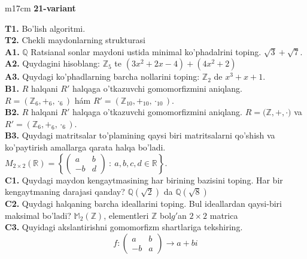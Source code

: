 \documentclass{article}
\begin{document}
\begin{tabular}{m{17cm}}
\textbf{21-variant}
\newline

\textbf{T1.} Bo'lish algoritmi. \\
\textbf{T2.} Chekli maydonlarning strukturasi \\
\textbf{A1.} \(\mathbb{Q}\) Ratsianal sonlar maydoni ustida minimal ko'phadalrini toping.
\(\sqrt{3} + \sqrt{7}\). \\
\textbf{A2.} Quydagini hisoblang:
\(\mathbb{Z}_{5}\) te \(\left( 3x^{2} + 2x - 4 \right) + \left( 4x^{2} + 2 \right)\) \\
\textbf{A3.} Quydagi ko'phadlarning barcha nollarini toping:
\(\mathbb{Z}_{2}\) de \(x^{3} + x + 1\). \\
\textbf{B1.} \(R\) halqani \(R'\) halqaga o'tkazuvchi gomomorfizmini aniqlang.
\(R = (\mathbb{Z}_{6}, +_{6}, \cdot_{6})\) hám \(R' = (\mathbb{Z}_{10}, +_{10}, \cdot_{10})\). \\
\textbf{B2.} \(R\) halqani \(R'\) halqaga o'tkazuvchi gomomorfizmini aniqlang.
\(R\mathbb{= (Z,} + , \cdot )\) va \(R' = (\mathbb{Z}_{6}, +_{6}, \cdot_{6})\). \\
\textbf{B3.} Quydagi matritsalar to'plamining qaysi biri matritsalarni qo'shish va ko'paytirish amallarga qarata halqa bo'ladi.
\(M_{2 \times 2}\mathbb{(R) =}\left\{ \begin{pmatrix}
a & b \\
 - b & d
\end{pmatrix}\ :\ a,b,c,d \in \mathbb{R} \right\}\). \\
\textbf{C1.} Quydagi maydon kengaytmasining har birining bazisini toping. Har bir kengaytmaning darajasi qanday?
\(\mathbb{Q}\left( \sqrt{2} \right)\) da \(\mathbb{Q}\left( \sqrt{8} \right)\) \\
\textbf{C2.} Quydagi halqaning barcha ideallarini toping. Bul ideallardan qaysi-biri maksimal bo'ladi?
\(\mathbb{M}_{2}\left( \mathbb{Z} \right)\), elementleri \(\mathbb{Z}\) bol\(g'\)an \(2 \times 2\) matrica \\
\textbf{C3.} Quyidagi akslantirishni gomomorfizm shartlariga tekshiring.
\[f:\begin{pmatrix}
a & b \\
 - b & a
\end{pmatrix} \rightarrow a + bi\] \\

\end{tabular}
\vspace{1cm}
\end{document}
